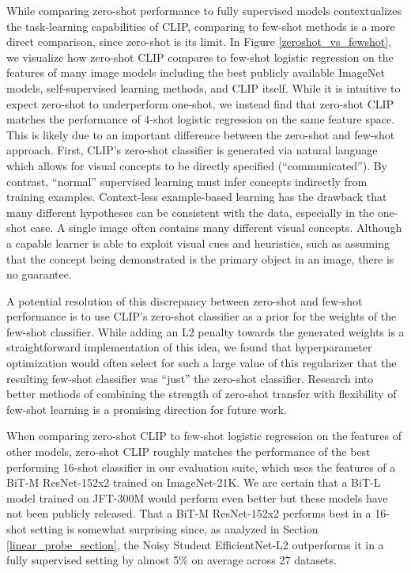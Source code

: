 While comparing zero-shot performance to fully supervised models contextualizes the task-learning capabilities of CLIP, comparing to few-shot methods is a more direct comparison, since zero-shot is its limit. In Figure \ref{zeroshot_vs_fewshot}, we visualize how zero-shot CLIP compares to few-shot logistic regression on the features of many image models including the best publicly available ImageNet models, self-supervised learning methods, and CLIP itself. While it is intuitive to expect zero-shot to underperform one-shot, we instead find that zero-shot CLIP matches the performance of 4-shot logistic regression on the same feature space. This is likely due to an important difference between the zero-shot and few-shot approach. First, CLIP's zero-shot classifier is generated via natural language which allows for visual concepts to be directly specified (``communicated''). By contrast, ``normal'' supervised learning must infer concepts indirectly from training examples. Context-less example-based learning has the drawback that many different hypotheses can be consistent with the data, especially in the one-shot case. A single image often contains many different visual concepts. Although a capable learner is able to exploit visual cues and heuristics, such as assuming that the concept being demonstrated is the primary object in an image, there is no guarantee.

A potential resolution of this discrepancy between zero-shot and few-shot performance is to use CLIP's zero-shot classifier as a prior for the weights of the few-shot classifier. While adding an L2 penalty towards the generated weights is a straightforward implementation of this idea, we found that hyperparameter optimization would often select for such a large value of this regularizer that the resulting few-shot classifier was ``just'' the zero-shot classifier. Research into better methods of combining the strength of zero-shot transfer with flexibility of few-shot learning is a promising direction for future work.

When comparing zero-shot CLIP to few-shot logistic regression on the features of other models, zero-shot CLIP roughly matches the performance of the best performing 16-shot classifier in our evaluation suite, which uses the features of a BiT-M ResNet-152x2 trained on ImageNet-21K. We are certain that a BiT-L model trained on JFT-300M would perform even better but these models have not been publicly released. That a BiT-M ResNet-152x2 performs best in a 16-shot setting is somewhat surprising since, as analyzed in Section \ref{linear_probe_section}, the Noisy Student EfficientNet-L2 outperforms it in a fully supervised setting by almost 5\% on average across 27 datasets.

